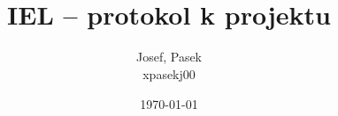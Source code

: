 \documentclass[fleqn]{fitiel} %
\title{\logo\\IEL -- protokol k projektu}
\author{Josef, Pasek \\ xpasekj00}
\date{\today} %
\begin{document}
	\maketitle

	\tableofcontents

	\newpage
    \sloppy
	 \newpage
	 \newpage
	 \newpage
	 \newpage
	 \newpage

    \clearpage
	
\end{document}
